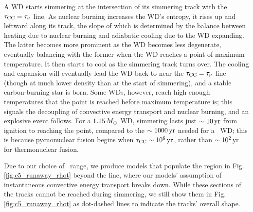 A WD starts simmering at the intersection of its simmering track with the $\taucc = \taunu$ line.  As nuclear burning increases the WD's entropy, it rises up and leftward along its track, the slope of which is determined by the balance between heating due to nuclear burning and adiabatic cooling due to the WD expanding.  The latter becomes more prominent as the WD becomes less degenerate, eventually balancing with the former when the WD reaches a point of maximum temperature.  It then starts to cool as the simmering track turns over.  The cooling and expansion will eventually lead the WD back to near the $\taucc = \taunu$ line (though at much lower density than at the start of simmering), and a stable carbon-burning star is born.  Some WDs, however, reach high enough temperatures that the \citeal{wooswk04} point is reached before maximum temperature is; this signals the decoupling of convective energy transport and nuclear burning, and an explosive event follows.  For a $1.15\,\Msun$ WD, simmering lasts just $\sim10\,\mathrm{yr}$ from ignition to reaching the \citeal{wooswk04} point, compared to the $\sim1000\,\mathrm{yr}$ needed for a \Mch\ WD; this is because pycnonuclear fusion begins when $\taucc \sim 10^6\,\mrm{yr}$, rather than $\sim10^{2}\,\mathrm{yr}$ for thermonuclear fusion.



Due to our choice of \Sc\ range, we produce models that populate the region in Fig. \ref{fig:c5_runaway_rhot} beyond the \citeal{wooswk04} line, where our models' assumption of instantaneous convective energy transport breaks down.  While these sections of the tracks cannot be reached during simmering, we still show them in Fig. \ref{fig:c5_runaway_rhot} as dot-dashed lines to indicate the tracks' overall shape.


